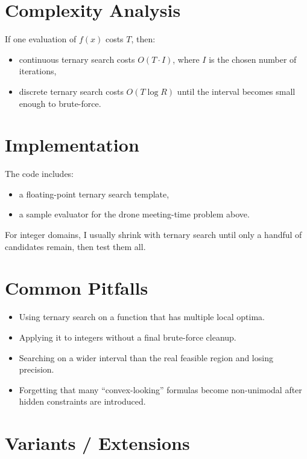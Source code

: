 \section*{Complexity Analysis}

If one evaluation of \(f(x)\) costs \(T\), then:

\begin{itemize}
  \item continuous ternary search costs \(O(T \cdot I)\), where \(I\) is the chosen number of iterations,
  \item discrete ternary search costs \(O(T \log R)\) until the interval becomes small enough to brute-force.
\end{itemize}

\section*{Implementation}

The code includes:

\begin{itemize}
  \item a floating-point ternary search template,
  \item a sample evaluator for the drone meeting-time problem above.
\end{itemize}

For integer domains, I usually shrink with ternary search until only a handful of candidates remain, then test them all.

\section*{Common Pitfalls}

\begin{itemize}
  \item Using ternary search on a function that has multiple local optima.
  \item Applying it to integers without a final brute-force cleanup.
  \item Searching on a wider interval than the real feasible region and losing precision.
  \item Forgetting that many ``convex-looking'' formulas become non-unimodal after hidden constraints are introduced.
\end{itemize}

\section*{Variants / Extensions}

